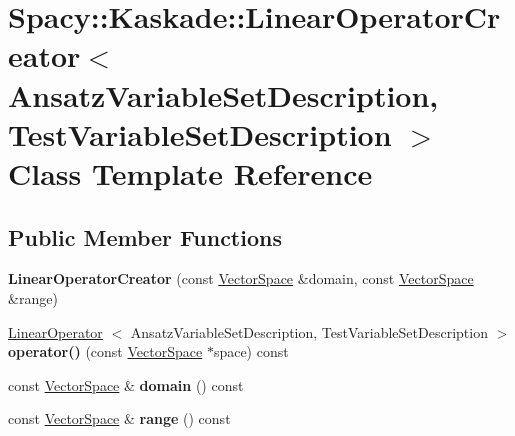 \hypertarget{classSpacy_1_1Kaskade_1_1LinearOperatorCreator}{\section{\-Spacy\-:\-:\-Kaskade\-:\-:\-Linear\-Operator\-Creator$<$ \-Ansatz\-Variable\-Set\-Description, \-Test\-Variable\-Set\-Description $>$ \-Class \-Template \-Reference}
\label{classSpacy_1_1Kaskade_1_1LinearOperatorCreator}
}
\subsection*{\-Public \-Member \-Functions}
\begin{DoxyCompactItemize}
\item 
\hypertarget{classSpacy_1_1Kaskade_1_1LinearOperatorCreator_a3cc4089037dcdf7e896b95d19063f56a}{{\bfseries \-Linear\-Operator\-Creator} (const \hyperlink{classSpacy_1_1VectorSpace}{\-Vector\-Space} \&domain, const \hyperlink{classSpacy_1_1VectorSpace}{\-Vector\-Space} \&range)}\label{classSpacy_1_1Kaskade_1_1LinearOperatorCreator_a3cc4089037dcdf7e896b95d19063f56a}

\item 
\hypertarget{classSpacy_1_1Kaskade_1_1LinearOperatorCreator_a7897a3843021097021854f7e1fcd938f}{\hyperlink{classSpacy_1_1Kaskade_1_1LinearOperator}{\-Linear\-Operator}\*
$<$ \-Ansatz\-Variable\-Set\-Description, \*
\-Test\-Variable\-Set\-Description $>$ {\bfseries operator()} (const \hyperlink{classSpacy_1_1VectorSpace}{\-Vector\-Space} $\ast$space) const }\label{classSpacy_1_1Kaskade_1_1LinearOperatorCreator_a7897a3843021097021854f7e1fcd938f}

\item 
\hypertarget{classSpacy_1_1Kaskade_1_1LinearOperatorCreator_ae5a94e31d885dcf4526737e5ab60e91a}{const \hyperlink{classSpacy_1_1VectorSpace}{\-Vector\-Space} \& {\bfseries domain} () const }\label{classSpacy_1_1Kaskade_1_1LinearOperatorCreator_ae5a94e31d885dcf4526737e5ab60e91a}

\item 
\hypertarget{classSpacy_1_1Kaskade_1_1LinearOperatorCreator_ae36b9e5b49159981d712a1d7193f52f8}{const \hyperlink{classSpacy_1_1VectorSpace}{\-Vector\-Space} \& {\bfseries range} () const }\label{classSpacy_1_1Kaskade_1_1LinearOperatorCreator_ae36b9e5b49159981d712a1d7193f52f8}

\end{DoxyCompactItemize}
